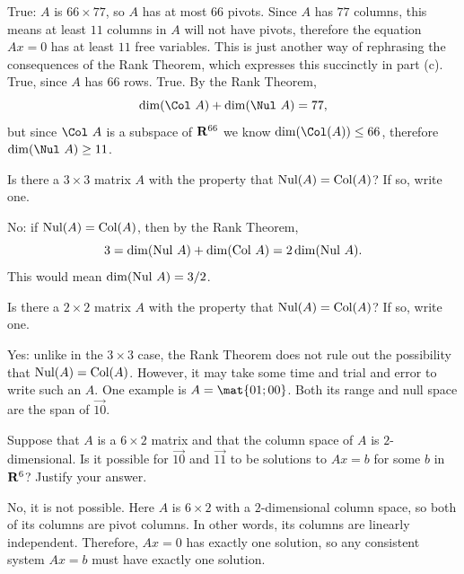 \begin{problems}
\begin{solution}
  \begin{subproblems}
    \subproblem True: $A$ is $66 \times 77$, so $A$ has at most $66$
    pivots.  Since $A$ has $77$ columns, this means at least $11$
    columns in $A$ will not have pivots, therefore the equation
    $Ax=0$ has at least $11$ free variables.  This is just another
    way of rephrasing the consequences of the Rank Theorem, which
    expresses this succinctly in part (c).
    \subproblem True, since $A$ has $66$ rows.
    \subproblem True.  By the Rank Theorem,
    \[\dim(\Col \ A) + \dim(\Nul \ A) = 77,\]
    but since $\Col \ A$ is a subspace of ${\bf R}^{66}$ we know
    $\dim(\Col(A)) \leq 66$, therefore $\dim(\Nul \ A) \geq 11$.
  \end{subproblems}
\end{solution}

\problem
Is there a $3 \times 3$ matrix $A$ with the property 
that $\textup{Nul}(A) = \textup{Col}(A)$?  If so, write one.

\begin{solution}
No: if $\textup{Nul}(A) = \textup{Col}(A)$, then by
    the Rank Theorem,
    \[3 = \dim(\textup{Nul} \ A) + \dim(\textup{Col} \ A) = 2
      \dim(\textup{Nul} \ A).\]
    This would mean
    $\dim(\textup{Nul} \ A) = 3/2$.    
\end{solution}

\problem 
Is there a $2 \times 2$ matrix $A$ with the property 
that $\textup{Nul}(A) = \textup{Col}(A)$?  If so, write one.

\begin{solution}
Yes: unlike in the $3 \times 3$ case, the Rank Theorem
    does not rule out the possibility that
    $\textup{Nul}(A) = \textup{Col}(A)$.  However, it may take some
    time and trial and error to write such an $A$.  One example is
    $A = \mat{0 1; 0 0}$.  Both its range and null space are the span
    of $\vec{1 0}$.
\end{solution}


\problem %
Suppose that $A$ is a $6 \times 2$ matrix and that the column space of $A$ is
$2$-dimensional.  Is it possible for $\vec{1 0}$ and $\vec{1 1}$ to be solutions
to $Ax = b$ for some $b$ in ${\bf R}^6$?  Justify your answer.

\begin{solution}
  No, it is not possible.  Here $A$ is $6 \times 2$ with a $2$-dimensional
  column space, so both of its columns are pivot columns.  In other words, its
  columns are linearly independent.  Therefore, $Ax = 0$ has exactly one
  solution, so any consistent system $Ax = b$ must have exactly one solution.
\end{solution}


\end{problems}

